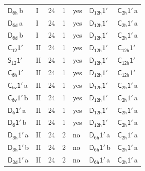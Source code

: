 \documentclass[10pt,a4paper]{article}
\numberwithin{equation}{section}
\newcommand{\grp}[1]{\mathsf{#1}}
\newcommand{\clsletter}[1]{\,{\scriptsize\color{black!55}#1}}
\begin{document}
{\begin{longtable}{@{}llrrlll@{}}
\href{../../../rotation/data/pdf/D6h.pdf}{$\grp{D_{6h}}$}\clsletter{b} & I & 24 & 1 & yes & \href{D12h-1p.pdf}{$\grp{D_{12h}1'}$} & \href{C2h-1p.pdf}{$\grp{C_{2h}1'}$}\clsletter{a}\\
\href{../../../rotation/data/pdf/D6d.pdf}{$\grp{D_{6d}}$}\clsletter{a} & I & 24 & 1 & yes & \href{D12h-1p.pdf}{$\grp{D_{12h}1'}$} & \href{C2h-1p.pdf}{$\grp{C_{2h}1'}$}\clsletter{a}\\
\href{../../../rotation/data/pdf/D6d.pdf}{$\grp{D_{6d}}$}\clsletter{b} & I & 24 & 1 & yes & \href{D12h-1p.pdf}{$\grp{D_{12h}1'}$} & \href{C2h-1p.pdf}{$\grp{C_{2h}1'}$}\clsletter{a}\\
\href{C12-1p.pdf}{$\grp{C_{12}1'}$} & II & 24 & 1 & yes & \href{D12h-1p.pdf}{$\grp{D_{12h}1'}$} & \href{C12h-1p.pdf}{$\grp{C_{12h}1'}$}\\
\href{S12-1p.pdf}{$\grp{S_{12}1'}$} & II & 24 & 1 & yes & \href{D12h-1p.pdf}{$\grp{D_{12h}1'}$} & \href{C12h-1p.pdf}{$\grp{C_{12h}1'}$}\\
\href{C6h-1p.pdf}{$\grp{C_{6h}1'}$} & II & 24 & 1 & yes & \href{D12h-1p.pdf}{$\grp{D_{12h}1'}$} & \href{C12h-1p.pdf}{$\grp{C_{12h}1'}$}\\
\href{C6v-1p.pdf}{$\grp{C_{6v}1'}$}\clsletter{a} & II & 24 & 1 & yes & \href{D12h-1p.pdf}{$\grp{D_{12h}1'}$} & \href{C2h-1p.pdf}{$\grp{C_{2h}1'}$}\clsletter{a}\\
\href{C6v-1p.pdf}{$\grp{C_{6v}1'}$}\clsletter{b} & II & 24 & 1 & yes & \href{D12h-1p.pdf}{$\grp{D_{12h}1'}$} & \href{C2h-1p.pdf}{$\grp{C_{2h}1'}$}\clsletter{a}\\
\href{D6-1p.pdf}{$\grp{D_{6}1'}$}\clsletter{a} & II & 24 & 1 & yes & \href{D12h-1p.pdf}{$\grp{D_{12h}1'}$} & \href{C2h-1p.pdf}{$\grp{C_{2h}1'}$}\clsletter{a}\\
\href{D6-1p.pdf}{$\grp{D_{6}1'}$}\clsletter{b} & II & 24 & 1 & yes & \href{D12h-1p.pdf}{$\grp{D_{12h}1'}$} & \href{C2h-1p.pdf}{$\grp{C_{2h}1'}$}\clsletter{a}\\
\href{D3h-1p.pdf}{$\grp{D_{3h}1'}$}\clsletter{a} & II & 24 & 2 & no & \href{D6h-1p.pdf}{$\grp{D_{6h}1'}$}\clsletter{a} & \href{C2h-1p.pdf}{$\grp{C_{2h}1'}$}\clsletter{a}\\
\href{D3h-1p.pdf}{$\grp{D_{3h}1'}$}\clsletter{b} & II & 24 & 2 & no & \href{D6h-1p.pdf}{$\grp{D_{6h}1'}$}\clsletter{b} & \href{C2h-1p.pdf}{$\grp{C_{2h}1'}$}\clsletter{a}\\
\href{D3d-1p.pdf}{$\grp{D_{3d}1'}$}\clsletter{a} & II & 24 & 2 & no & \href{D6h-1p.pdf}{$\grp{D_{6h}1'}$}\clsletter{a} & \href{C2h-1p.pdf}{$\grp{C_{2h}1'}$}\clsletter{a}\\

\end{longtable}}
\end{document}
